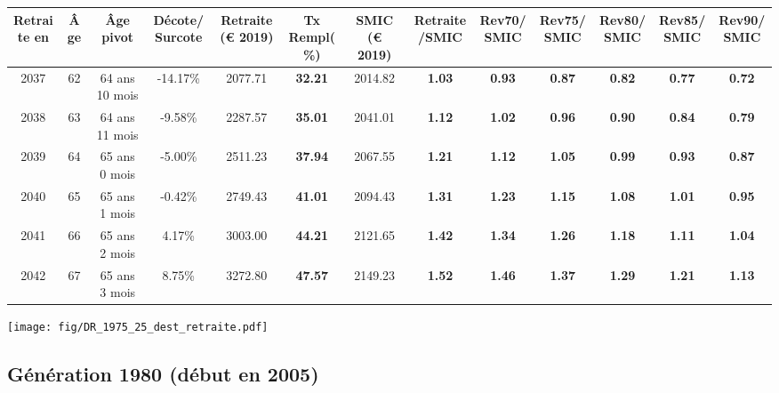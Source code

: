 { \scriptsize \begin{center} 
\begin{tabular}[htb]{|c|c||c|c||c|c||c||c|c|c|c|c|c|} 
\hline 
 Retraite en &  Âge &  Âge pivot &  Décote/Surcote &  Retraite (\euro{} 2019) &  Tx Rempl(\%) &  SMIC (\euro{} 2019) &  Retraite/SMIC &  Rev70/SMIC &  Rev75/SMIC &  Rev80/SMIC &  Rev85/SMIC &  Rev90/SMIC \\ 
\hline \hline 
 2037 &  62 &  64 ans 10 mois &  -14.17\% &  2077.71 &  {\bf 32.21} &  2014.82 &  {\bf 1.03} &  {\bf {\color{red} 0.93}} &  {\bf {\color{red} 0.87}} &  {\bf {\color{red} 0.82}} &  {\bf {\color{red} 0.77}} &  {\bf {\color{red} 0.72}} \\ 
\hline 
 2038 &  63 &  64 ans 11 mois &  -9.58\% &  2287.57 &  {\bf 35.01} &  2041.01 &  {\bf 1.12} &  {\bf 1.02} &  {\bf {\color{red} 0.96}} &  {\bf {\color{red} 0.90}} &  {\bf {\color{red} 0.84}} &  {\bf {\color{red} 0.79}} \\ 
\hline 
 2039 &  64 &  65 ans 0 mois &  -5.00\% &  2511.23 &  {\bf 37.94} &  2067.55 &  {\bf 1.21} &  {\bf 1.12} &  {\bf 1.05} &  {\bf {\color{red} 0.99}} &  {\bf {\color{red} 0.93}} &  {\bf {\color{red} 0.87}} \\ 
\hline 
 2040 &  65 &  65 ans 1 mois &  -0.42\% &  2749.43 &  {\bf 41.01} &  2094.43 &  {\bf 1.31} &  {\bf 1.23} &  {\bf 1.15} &  {\bf 1.08} &  {\bf 1.01} &  {\bf {\color{red} 0.95}} \\ 
\hline 
 2041 &  66 &  65 ans 2 mois &  4.17\% &  3003.00 &  {\bf 44.21} &  2121.65 &  {\bf 1.42} &  {\bf 1.34} &  {\bf 1.26} &  {\bf 1.18} &  {\bf 1.11} &  {\bf 1.04} \\ 
\hline 
 2042 &  67 &  65 ans 3 mois &  8.75\% &  3272.80 &  {\bf 47.57} &  2149.23 &  {\bf 1.52} &  {\bf 1.46} &  {\bf 1.37} &  {\bf 1.29} &  {\bf 1.21} &  {\bf 1.13} \\ 
\hline 
\hline 
\end{tabular} 
\end{center} } 

 \begin{center}\texttt{[image: fig/DR\_1975\_25\_dest\_retraite.pdf]}\end{center} \label{fig/DR_1975_25_dest_retraite.pdf} 

\newpage 
 
\subsection{Génération 1980 (début en 2005)} 

